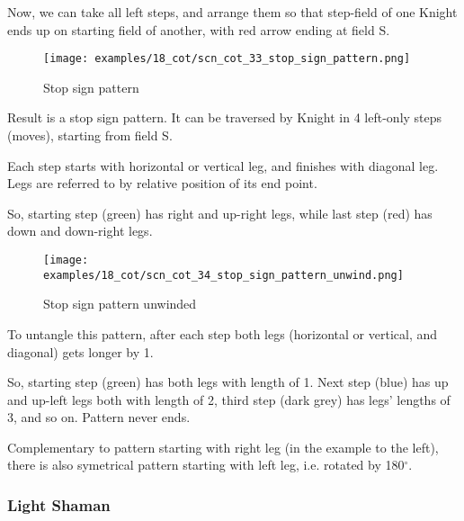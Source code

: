Now, we can take all left steps, and arrange them so that step-field of one
Knight ends up on starting field of another, with red arrow ending at field S.


\vspace*{0.10\textheight}
\noindent
\begin{wrapfigure}[12]{l}{0.4\textwidth}
\centering
\texttt{[image: examples/18\_cot/scn\_cot\_33\_stop\_sign\_pattern.png]}
\caption{Stop sign pattern}
\label{fig:scn_cot_33_stop_sign_pattern}
\end{wrapfigure}
Result is a stop sign pattern. It can be traversed by Knight in 4 left-only
steps (moves), starting from field S.

Each step starts with horizontal or vertical leg, and finishes with diagonal
leg. Legs are referred to by relative position of its end point.

So, starting step (green) has right and up-right legs, while last step (red)
has down and down-right legs.

\clearpage %

\noindent
\begin{wrapfigure}{l}{0.4\textwidth} %
\centering
\texttt{[image: examples/18\_cot/scn\_cot\_34\_stop\_sign\_pattern\_unwind.png]}
\caption{Stop sign pattern unwinded}
\label{fig:scn_cot_34_stop_sign_pattern_unwind}
\end{wrapfigure}
To untangle this pattern, after each step both legs (horizontal or vertical,
and diagonal) gets longer by 1.

So, starting step (green) has both legs with length of 1. Next step (blue)
has up and up-left legs both with length of 2, third step (dark grey) has
legs' lengths of 3, and so on. Pattern never ends.

Complementary to pattern starting with right leg (in the example to the
left), there is also symetrical pattern starting with left leg, i.e.
rotated by 180$^{\circ}$. %

\clearpage %

\subsubsection*{Light Shaman}
\label{sec:Conquest of Tlalocan/Trance-journey/Movement/Light Shaman}

